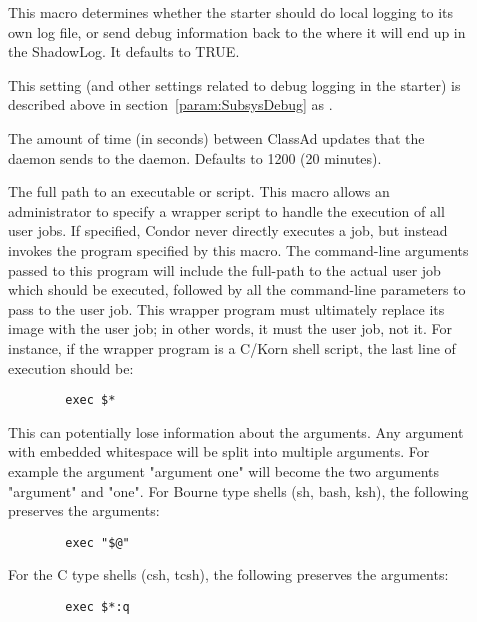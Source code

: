 \begin{description}
\item[]
  \label{param:StarterLocalLogging} This macro determines whether the
  starter should do local logging to its own log file, or send debug
  information back to the  where it will end up in the
  ShadowLog.  It defaults to TRUE.

\item[] \label{param:StarterDebug} This setting
  (and other settings related to debug logging in the starter) is
  described above in section~\ref{param:SubsysDebug} as
  .

\item[] \label{param:StarterUpdateInterval}
The amount of time (in seconds) between ClassAd updates that the
 daemon sends to the  daemon.
Defaults to 1200 (20 minutes).

\item[] \label{param:UserJobWrapper} 
  The full path to an executable or script.
  This macro
  allows an administrator to specify a wrapper script to handle the
  execution of all user jobs.  
  If specified, Condor never directly executes a job, but instead
  invokes the program specified by this macro.
  The command-line arguments passed to this program will include the
  full-path to the actual user job which should be executed, followed by all
  the command-line parameters to pass to the user job.
  This wrapper program must ultimately replace its image with the user job;
  in other words,
  it must  the user job, not  it.
  For instance, if the wrapper program is a C/Korn shell script, the
  last line of execution should be:
\begin{verbatim}
        exec $*
\end{verbatim}
  This can potentially lose information about the arguments.
  Any argument with embedded whitespace will be split into multiple
  arguments.
  For example the argument "argument one" will become the two arguments
  "argument" and "one".
  For Bourne type shells (sh, bash, ksh),
  the following preserves the arguments:
\begin{verbatim}
        exec "$@"
\end{verbatim}
  For the C type shells (csh, tcsh), the following preserves the
  arguments:
\begin{verbatim}
        exec $*:q
\end{verbatim}



\end{description}
